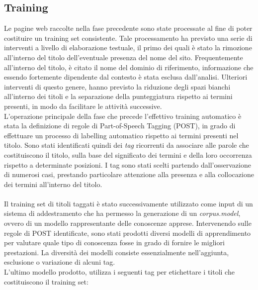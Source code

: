 \documentclass[a4paper]{report}
\begin{document}
\subsection{Training}
Le pagine web raccolte nella fase precedente sono state processate al fine di poter costituire un training set consistente. Tale processamento ha previsto una serie di interventi a livello di elaborazione testuale, il primo dei quali è stato la rimozione all'interno del titolo dell'eventuale presenza del nome del sito. Frequentemente all'interno del titolo, è citato il nome del dominio di riferimento, informazione che essendo fortemente dipendente dal contesto è stata esclusa dall'analisi. Ulteriori interventi di questo genere, hanno previsto la riduzione degli spazi bianchi all'interno dei titoli e la separazione della punteggiatura rispetto ai termini presenti, in modo da facilitare le attività successive. \\
L'operazione principale della fase che precede l'effettivo training automatico è stata la definizione di regole di Part-of-Speech Tagging (POST), in grado di effettuare un processo di labelling automatico rispetto ai termini presenti nel titolo. Sono stati identificati quindi dei \textit{tag} ricorrenti da associare alle parole che costituiscono il titolo, sulla base del significato dei termini e della loro occorrenza rispetto a determinate posizioni. I tag sono stati scelti partendo dall'osservazione di numerosi casi, prestando particolare attenzione alla presenza e alla collocazione dei termini all'interno del titolo. \\ \\
Il training set di titoli taggati è stato successivamente utilizzato come input di un sistema di addestramento che ha permesso la generazione di un \textit{corpus.model}, ovvero di un modello rappresentante delle conoscenze apprese. Intervenendo sulle regole di POST identificate, sono stati prodotti diversi modelli di apprendimento per valutare quale tipo di conoscenza fosse in grado di fornire le migliori prestazioni. La diversità dei modelli consiste essenzialmente nell'aggiunta, esclusione o variazione di alcuni tag. \\
L'ultimo modello prodotto, utilizza i seguenti tag per etichettare i titoli che costituiscono il training set: 
\\ \\ 
\end{document}
